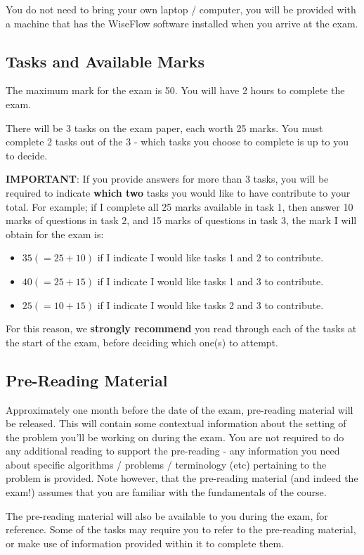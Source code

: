 You do not need to bring your own laptop / computer, you will be provided with a machine that has the WiseFlow software installed when you arrive at the exam.

\subsection{Tasks and Available Marks}

The maximum mark for the exam is 50.
You will have 2 hours to complete the exam.

There will be 3 tasks on the exam paper, each worth 25 marks.
You must complete 2 tasks out of the 3 - which tasks you choose to complete is up to you to decide.

\textbf{IMPORTANT}: If you provide answers for more than 3 tasks, you will be required to indicate \textbf{which two} tasks you would like to have contribute to your total.
For example; if I complete all 25 marks available in task 1, then answer 10 marks of questions in task 2, and 15 marks of questions in task 3, the mark I will obtain for the exam is:

\begin{itemize}
  \item $35 ( = 25 + 10)$ if I indicate I would like tasks 1 and 2 to contribute.
  \item $40 ( = 25 + 15)$ if I indicate I would like tasks 1 and 3 to contribute.
  \item $25 ( = 10 + 15)$ if I indicate I would like tasks 2 and 3 to contribute.
\end{itemize}

For this reason, we \textbf{strongly recommend} you read through each of the tasks at the start of the exam, before deciding which one(s) to attempt.

\subsection{Pre-Reading Material} \label{sec:pre-reading-material}

Approximately one month before the date of the exam, pre-reading material will be released.
This will contain some contextual information about the setting of the problem you'll be working on during the exam.
You are not required to do any additional reading to support the pre-reading - any information you need about specific algorithms / problems / terminology (etc) pertaining to the problem is provided.
Note however, that the pre-reading material (and indeed the exam!) assumes that you are familiar with the fundamentals of the course.

The pre-reading material will also be available to you during the exam, for reference.
Some of the tasks may require you to refer to the pre-reading material, or make use of information provided within it to complete them.
